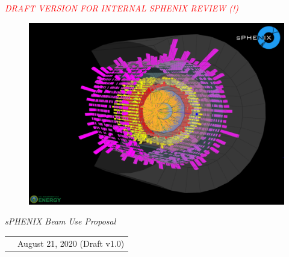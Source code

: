 \renewcommand*\familydefault{\sfdefault}
{\sffamily
\vfill

\begin{center}
    \emph{\Large{\textcolor{red}{DRAFT VERSION FOR INTERNAL SPHENIX REVIEW (!)}}}
\end{center}

\vfill


\vfill

\begin{figure}[htpb]
\begin{center}
\includegraphics[width=1.0\linewidth]{figs/EventDisplayAuAuLogo.pdf}
\end{center}
\end{figure}


\vfill

\begin{center}
  \large
  \emph{\Large{sPHENIX Beam Use Proposal}}
  
  \begin{tabular}{rl}
&August 21, 2020 (Draft v1.0) \\
  \end{tabular}
\end{center}
}



\renewcommand*\familydefault{\rmdefault}
